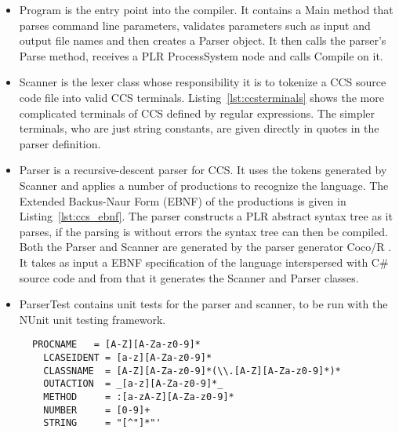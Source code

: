 	\begin{itemize}
	
	\item \textsf{Program} is the entry point into the compiler. It contains a 
	\textsf{Main} method that parses command line parameters, validates 
	parameters such as input and output file names and then creates a 
	\textsf{Parser} object. It then calls the parser's \textsf{Parse} method, 
	receives a PLR \textsf{ProcessSystem} node and calls \textsf{Compile} on it. 
	
	\item \textsf{Scanner} is the lexer class whose responsibility it is to tokenize a CCS source code file into valid CCS terminals. Listing~\ref{lst:ccsterminals} shows the more complicated terminals of CCS defined by regular expressions. The simpler terminals, who are just string constants, are given directly in quotes in the parser definition.
	
  \item \textsf{Parser} is a recursive-descent parser for CCS. It uses the 
  tokens generated by \textsf{Scanner} and applies a number of 
  \textsf{productions} to recognize the language. The Extended Backus-Naur 
  Form (EBNF) of the productions is given in Listing~\ref{lst:ccs_ebnf}. The 
  parser constructs a PLR abstract syntax tree as it parses, if the parsing is 
  without errors the syntax tree can then be compiled. Both the 
  \textsf{Parser} and \textsf{Scanner} are generated by the parser generator 
  Coco/R \cite{cocor}. It takes as input a EBNF specification of the language 
  interspersed with C\# source code and from that it generates the 
  \textsf{Scanner} and \textsf{Parser} classes. 
	
	\item \textsf{ParserTest} contains unit tests for the parser and scanner, to 
	be run with the NUnit unit testing framework.
	
	\end{itemize}
	\begin{figure}
\lstset{showtabs=false,showspaces=false,showstringspaces=false}
\begin{lstlisting}[caption=Terminals of CCS scanner,label=lst:ccsterminals,frame=trbl,basicstyle=\scriptsize\ttfamily,showtabs=false,showspaces=false]
  PROCNAME   = [A-Z][A-Za-z0-9]*
  LCASEIDENT = [a-z][A-Za-z0-9]*
  CLASSNAME  = [A-Z][A-Za-z0-9]*(\\.[A-Z][A-Za-z0-9]*)*
  OUTACTION  = _[a-z][A-Za-z0-9]*_
  METHOD     = :[a-zA-Z][A-Za-z0-9]*
  NUMBER     = [0-9]+
  STRING     = "[^"]*"'
  \end{lstlisting}
	\end{figure}
	
